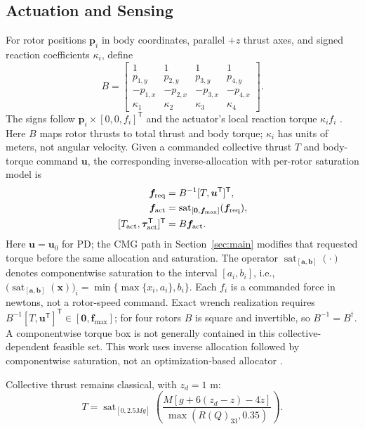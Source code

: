 \documentclass[letterpaper, 10 pt, conference]{ieeeconf}
\newcommand{\T}{^{\mathsf T}}
\newcommand{\sat}{\operatorname{sat}}
\begin{document}
\subsection{Actuation and Sensing}
%
For rotor positions $\bm p_i$ in body coordinates, parallel $+z$ thrust
axes, and signed reaction coefficients $\kappa_i$, define
\begin{equation}
 B=\begin{bmatrix}
 1&1&1&1\\p_{1,y}&p_{2,y}&p_{3,y}&p_{4,y}\\
 -p_{1,x}&-p_{2,x}&-p_{3,x}&-p_{4,x}\\
 \kappa_1&\kappa_2&\kappa_3&\kappa_4
 \end{bmatrix}.
 \label{eq:allocationmatrix}
\end{equation}
The signs follow $\bm p_i\times[0,0,f_i]\T$ and the actuator's local reaction torque $\kappa_i f_i$ \cite{garciacarrillo2013quad}. Here $B$ maps rotor thrusts to total thrust and body torque; $\kappa_i$ has units of meters, not angular velocity. Given a commanded collective thrust $T$ and body-torque command $\bm u$, the corresponding inverse-allocation with per-rotor saturation model is
\begin{equation}
 \begin{aligned}
 \bm f_{\rm req}&=B^{-1}[T,\bm u\T]\T,\\
 \bm f_{\rm act}&=\sat_{[\bm0,\bm f_{\max}]}(\bm f_{\rm req}),\\
 [T_{\rm act},\bm\tau_{\rm act}\T]\T&=B\bm f_{\rm act}.
 \end{aligned}
 \label{eq:mixer}
\end{equation}
Here $\bm u=\bm u_0$ for PD; the CMG path in Section~\ref{sec:main}
modifies that requested torque before the same allocation and saturation.
The operator $\sat_{[\bm a,\bm b]}(\cdot)$ denotes componentwise saturation to the interval $[a_i,b_i]$, i.e.,
$\bigl(\sat_{[\bm a,\bm b]}(\bm x)\bigr)_i=\min\{\max\{x_i,a_i\},b_i\}$.
Each $f_i$ is a commanded force in newtons, not a rotor-speed command.
Exact wrench realization requires $B^{-1}[T,\bm u\T]\T\in[\bm0,\bm f_{\max}]$; for four
rotors $B$ is square and invertible, so $B^{-1}=B^{\dagger}$.
A componentwise torque box is not generally contained in this
collective-dependent feasible set. This work uses inverse allocation followed by componentwise saturation,
not an optimization-based allocator \cite{monteiro2016allocation}.

Collective thrust remains classical, with $z_d=1$ m:
\begin{equation}
 T=\sat_{[0,2.5Mg]}
 \left(\frac{M[g+6(z_d-z)-4\dot z]}{\max(R(Q)_{33},0.35)}\right).
 \label{eq:collective}
\end{equation}
\end{document}
